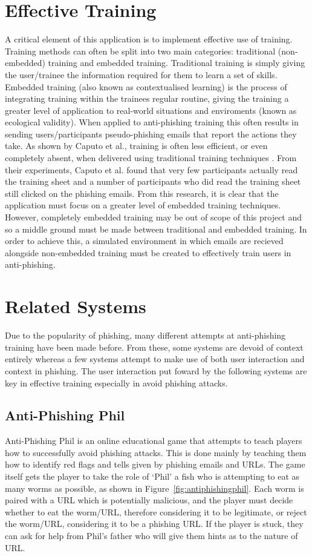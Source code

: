 \documentclass{l4proj}
\begin{document}
\section{Effective Training}
A critical element of this application is to implement effective use of training. Training methods can often be split into two main categories: traditional (non-embedded) training and embedded training. Traditional training is simply giving the user/trainee the information required for them to learn a set of skills. Embedded training (also known as contextualised learning) is the process of integrating training within the trainees regular routine, giving the training a greater level of application to real-world situations and enviroments (known as ecological validity). When applied to anti-phishing training this often results in sending users/participants pseudo-phishing emails that report the actions they take. As shown by Caputo et al., training is often less efficient, or even completely absent, when delivered using traditional training techniques \citep{caputo2014embedded}. From their experiments, Caputo et al. found that very few participants actually read the training sheet and a number of participants who did read the training sheet still clicked on the phishing emails. From this research, it is clear that the application must focus on a greater level of embedded training techniques. However, completely embedded training may be out of scope of this project and so a middle ground must be made between traditional and embedded training. In order to achieve this, a simulated environment in which emails are recieved alongside non-embedded training must be created to effectively train users in anti-phishing.


\section{Related Systems}
Due to the popularity of phishing, many different attempts at anti-phishing training have been made before. From these, some systems are devoid of context entirely whereas a few systems attempt to make use of both user interaction and context in phishing. The user interaction put foward by the following systems are key in effective training especially in avoid phishing attacks.

\subsection{Anti-Phishing Phil}
Anti-Phishing Phil \citep{sheng2007anti} is an online educational game that attempts to teach players how to successfully avoid phishing attacks. This is done mainly by teaching them how to identify red flags and tells given by phishing emails and URLs. The game itself gets the player to take the role of ‘Phil’ a fish who is attempting to eat as many worms as possible, as shown in Figure~\ref{fig:antiphishingphil}. Each worm is paired with a URL which is potentially malicious, and the player must decide whether to eat the worm/URL, therefore considering it to be legitimate, or reject the worm/URL, considering it to be a phishing URL. If the player is stuck, they can ask for help from Phil’s father who will give them hints as to the nature of URL. 
\end{document}
